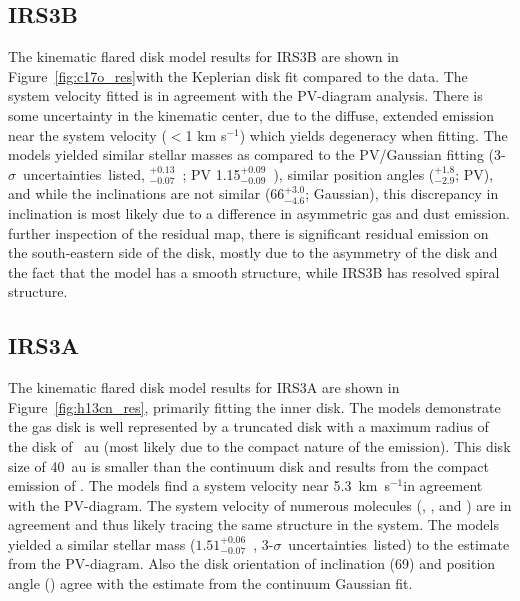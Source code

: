 \documentclass[twocolumn, 12pt, trackchanges]{aastex63}
\begin{document}
\subsection{IRS3B}
The \pdspy\space kinematic flared disk model results for IRS3B are shown in Figure~\ref{fig:c17o_res}\space with the Keplerian disk fit compared to the data. The system velocity fitted is in agreement with the PV-diagram analysis. There is some uncertainty in the kinematic center, due to the diffuse, extended emission near the system velocity ($<$1 km s$^{-1}$) which yields degeneracy when fitting. The models yielded similar stellar masses as compared to the PV/Gaussian fitting (3-$\sigma$~uncertainties~listed, \pdspy{}$^{+0.13}_{-0.07}$~\solm; PV 1.15$^{+0.09}_{-0.09}$~\solm), similar position angles (\pdspy{}$^{+  1.8}_{-  2.9}$\deg; PV\deg), and while the inclinations are not similar (\pdspy\space$66^{+ 3.0}_{- 4.6}$\deg; Gaussian\deg), this discrepancy in inclination is most likely due to a difference in asymmetric gas and dust emission.  further inspection of the residual map, there is significant residual emission on the south-eastern side of the disk, mostly due to the asymmetry of the disk and the fact that the model has a smooth structure, while IRS3B has resolved spiral structure.

\subsection{IRS3A}
The \pdspy\space kinematic flared disk model results for IRS3A are shown in Figure~\ref{fig:h13cn_res}, primarily fitting the inner disk. The models demonstrate the gas disk is well represented by a truncated disk with a maximum radius of the disk of ~au (most likely due to the compact nature of the emission). This disk size of 40~au is smaller than the continuum disk and results from the compact emission of \htcn. The models find a system velocity near 5.3~km~s$^{-1}$\space in agreement with the PV-diagram. The system velocity of numerous molecules (\htcop, \cso, and \htcn) are in agreement and thus likely tracing the same structure in the system. The models yielded a similar stellar mass ($1.51^{+0.06}_{-0.07}$~\solm, 3-$\sigma$~uncertainties~listed) to the estimate from the PV-diagram. Also the disk orientation of inclination (69\deg) and position angle (\deg) agree with the estimate from the continuum Gaussian fit.
\end{document}
